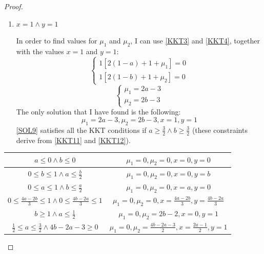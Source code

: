 \begin{proof}
\begin{enumerate}
\begin{itemize}
            \end{itemize}
        \item \(x = 1 \land y = 1\)\par
            In order to find values for \(\mu_1\) and \(\mu_2\), I can use \eqref{KKT3} and \eqref{KKT4}, together with the values \(x = 1\) and \(y = 1\):
            \[
                \begin{cases}
                    1[2(1-a) + 1 + \mu_1] = 0 \\
                    1[2(1-b) + 1 + \mu_2] = 0
                \end{cases}
            \]
            \[
                \begin{cases}
                    \mu_1 = 2a - 3 \\
                    \mu_2 = 2b - 3
                \end{cases}
            \]
            The only solution that I have found is the following:
            \begin{equation} \label{SOL9}
                \mu_1 = 2a - 3, \mu_2 = 2b - 3, x = 1, y = 1 \tag{SOL9}
            \end{equation}
            \eqref{SOL9} satisfies all the KKT conditions if \(a \geq \frac{3}{2} \land b \geq \frac{3}{2}\) (these constraints derive from \eqref{KKT11} and \eqref{KKT12}).
    \end{enumerate}
    \begin{table}
        \centering
        \begin{tabu}{| c | c |}
            \hline
            \(a \leq 0 \land b \leq 0\) &   \(\mu_1 = 0, \mu_2 = 0, x = 0, y = 0    \) \\ \hline
            \(0 \leq b \leq 1 \land a \leq \frac{b}{2}\) &   \(\mu_1 = 0, \mu_2 = 0, x = 0, y = b\) \\ \hline
            \(0 \leq a \leq 1 \land b \leq \frac{a}{2}\) &   \(\mu_1 = 0, \mu_2 = 0, x = a, y = 0\) \\ \hline
            \(0 \leq \frac{4a-2b}{3} \leq 1 \land 0 \leq \frac{4b-2a}{3} \leq 1\) &   \(\mu_1 = 0, \mu_2 = 0, x = \frac{4a - 2b}{3}, y = \frac{4b-2a}{3}\) \\ \hline
            \(b \geq 1 \land a \leq \frac{1}{2}\) &   \(\mu_1 = 0, \mu_2 = 2b - 2, x = 0, y = 1\) \\ \hline
            \(\frac{1}{2} \leq a \leq \frac{3}{2} \land 4b -2a -3 \geq 0\) &   \(\mu_1 = 0, \mu_2 = \frac{4b - 2a - 3}{2}, x = \frac{2a - 1}{2}, y = 1\) \\ \hline

\end{tabu}
\end{table}
\end{proof}
